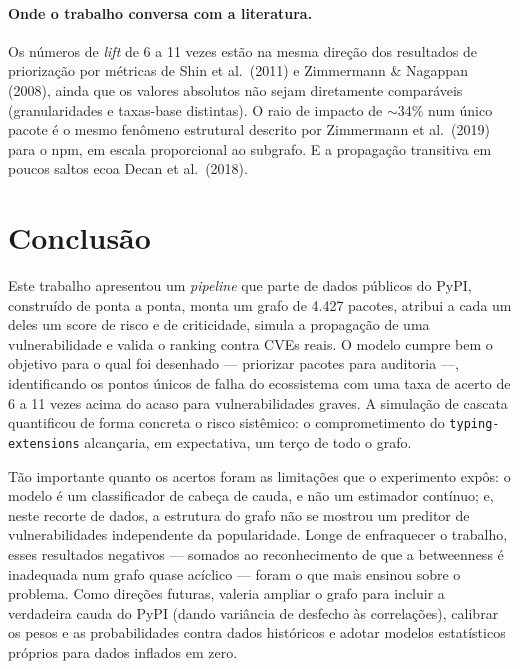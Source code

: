 \documentclass[11pt,a4paper]{article}
\begin{document}
\paragraph{Onde o trabalho conversa com a literatura.}
Os números de \emph{lift} de 6 a 11 vezes estão na mesma direção dos resultados de
priorização por métricas de Shin et al.\ (2011) e Zimmermann \& Nagappan (2008),
ainda que os valores absolutos não sejam diretamente comparáveis (granularidades e
taxas-base distintas). O raio de impacto de $\sim$34\% num único pacote é o mesmo
fenômeno estrutural descrito por Zimmermann et al.\ (2019) para o npm, em escala
proporcional ao subgrafo. E a propagação transitiva em poucos saltos ecoa
Decan et al.\ (2018).

\section{Conclusão}

Este trabalho apresentou um \emph{pipeline} que parte de dados públicos do
PyPI, construído de ponta a ponta, monta um grafo de 4.427 pacotes, atribui a cada um
deles um score de risco e de criticidade, simula a propagação de uma vulnerabilidade e
valida o ranking contra CVEs reais. O modelo cumpre bem o objetivo para o qual foi desenhado --- priorizar
pacotes para auditoria ---, identificando os pontos únicos de falha do ecossistema com
uma taxa de acerto de 6 a 11 vezes acima do acaso para vulnerabilidades graves. A
simulação de cascata quantificou de forma concreta o risco sistêmico: o
comprometimento do \texttt{typing-extensions} alcançaria, em expectativa, um terço de
todo o grafo.

Tão importante quanto os acertos foram as limitações que o experimento expôs: o modelo é um classificador de cabeça de cauda, e não um estimador contínuo;
e, neste recorte de dados, a estrutura do grafo não se mostrou um preditor de
vulnerabilidades independente da popularidade. Longe de enfraquecer o trabalho,
esses resultados negativos --- somados ao reconhecimento de que a betweenness é
inadequada num grafo quase acíclico --- foram o que mais ensinou sobre o problema.
Como direções futuras, valeria ampliar o grafo para incluir a verdadeira cauda do
PyPI (dando variância de desfecho às correlações), calibrar os pesos e as
probabilidades contra dados históricos e adotar modelos estatísticos próprios para
dados inflados em zero.
\end{document}
